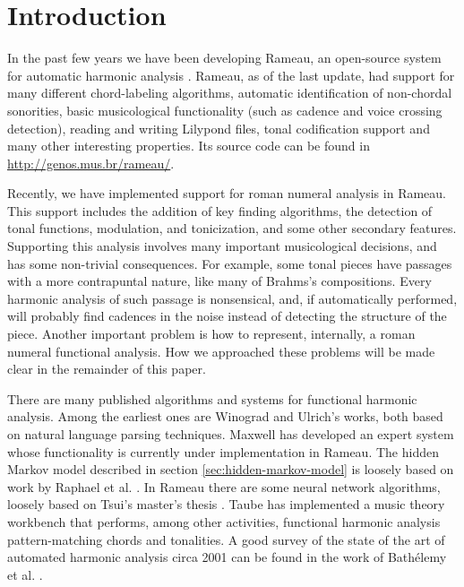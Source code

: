 
\section{Introduction}
\label{sec:introduction}

In the past few years we have been developing Rameau, an open-source
system for automatic harmonic analysis \cite{kroger08:rameau}. Rameau,
as of the last update, had support for many different chord-labeling
algorithms, automatic identification of non-chordal sonorities, basic
musicological functionality (such as cadence and voice crossing
detection), reading and writing Lilypond \cite{nienhuys.ea08:lilypond}
files, tonal codification support and many other interesting
properties. Its source code can be found in
\url{http://genos.mus.br/rameau/}.

Recently, we have implemented support for roman numeral analysis in
Rameau. This support includes the addition of key finding algorithms,
the detection of tonal functions, modulation, and tonicization, and
some other secondary features. Supporting this analysis involves many
important musicological decisions, and has some non-trivial
consequences. For example, some tonal pieces have passages with a more
contrapuntal nature, like many of Brahms's compositions.  Every
harmonic analysis of such passage is nonsensical, and, if
automatically performed, will probably find cadences in the noise
instead of detecting the structure of the piece. Another important
problem is how to represent, internally, a roman numeral functional
analysis. How we approached these problems will be made clear in the
remainder of this paper.

There are many published algorithms and systems for functional
harmonic analysis. Among the earliest ones are Winograd
\cite{winograd68:linguistics} and Ulrich's \cite{ulrich77:analysis}
works, both based on natural language parsing techniques. Maxwell
\cite{maxwell92:expert} has developed an expert system whose
functionality is currently under implementation in Rameau. The hidden
Markov model described in section \ref{sec:hidden-markov-model} is
loosely based on work by Raphael et
al. \cite{raphael.ea03:harmonic}. In Rameau there are some neural
network algorithms, loosely based on Tsui's master's thesis
\cite{tsui02:harmonic}. Taube \cite{taube99:automatic} has implemented
a music theory workbench that performs, among other activities,
functional harmonic analysis pattern-matching chords and tonalities. A
good survey of the state of the art of automated harmonic analysis
circa 2001 can be found in the work of Bathélemy et
al. \cite{barthelemy.ea01:figured}.

